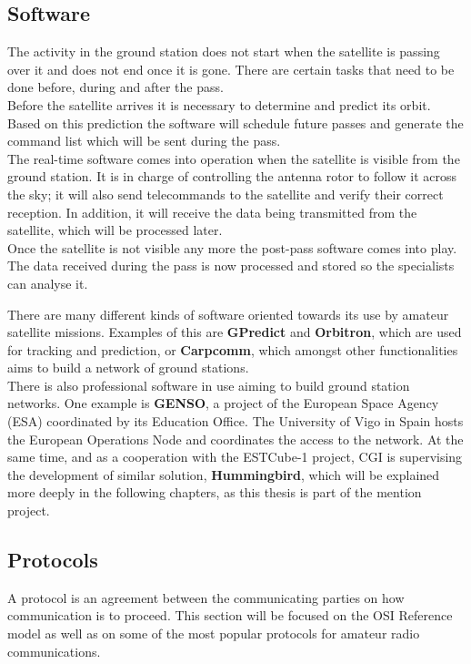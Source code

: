 \subsection{Software}
The activity in the ground station does not start when the satellite is passing over it and does not end once it is gone. There are certain tasks that need to be done before, during and after the pass.\\

Before the satellite arrives it is necessary to determine and predict its orbit. Based on this prediction the software will schedule future passes and generate the command list which will be sent during the pass.\\

The real-time software comes into operation when the satellite is visible from the ground station. It is in charge of controlling the antenna rotor to follow it across the sky; it will also send telecommands to the satellite and verify their correct reception. In addition, it will receive the data being transmitted from the satellite, which will be processed later.\\

Once the satellite is not visible any more the post-pass software comes into play. The data received during the pass is now processed and stored so the specialists can analyse it.


There are many different kinds of software oriented towards its use by amateur satellite missions. Examples of this are \textbf{GPredict}\cite{GPredict} and \textbf{Orbitron}\cite{Orbitron}, which are used for tracking and prediction, or \textbf{Carpcomm}\cite{Carpcomm}, which amongst other functionalities aims to build a network of ground stations.\\

There is also professional software in use aiming to build ground station networks. One example is \textbf{GENSO}, a project of the European Space Agency (ESA) coordinated by its Education Office. The University of Vigo in Spain hosts the European Operations Node and coordinates the access to the network\cite{GENSO}. At the same time, and as a cooperation with the ESTCube-1 project, CGI is supervising the development of similar solution, \textbf{Hummingbird}\cite{CGI}, which will be explained more deeply in the following chapters, as this thesis is part of the mention project.


\subsection{Protocols}
A protocol is an agreement between the communicating parties on how communication is to proceed\cite{Tanenbaum}. This section will be focused on the OSI Reference model as well as on some of the most popular protocols for amateur radio communications.

